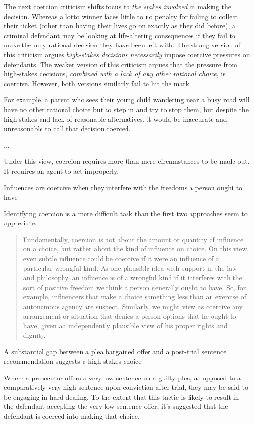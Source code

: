 The next coercion criticism shifts focus to \textit{the stakes involved} in making the decision. Whereas a lotto winner faces little to no penalty for failing to collect their ticket (other than having their lives go on exactly as they did before), a criminal defendant may be looking at life-altering consequences if they fail to make the only rational decision they have been left with. The strong version of this criticism argues \textit{high-stakes decisions necessarily} impose coercive pressures on defendants. The weaker version of this criticism argues that the pressure from high-stakes decisions, \textit{combined with a lack of any other rational choice}, is coercive. However, both versions similarly fail to hit the mark. 

For example, a parent who sees their young child wandering near a busy road will have no other rational choice but to step in and try to stop them, but despite the high stakes and lack of reasonable alternatives, it would be inaccurate and unreasonable to call that decision coerced. 

... 

Under this view, coercion requires more than mere circumstances to be made out. It requires an agent to act improperly. 

Influences are coercive when they interfere with the freedoms a person ought to have

Identifying coercion is a more difficult task than the first two approaches seem to appreciate.
\begin{quote}
    Fundamentally, coercion is not about the amount or quantity of influence on a choice, but rather about the kind of influence on \textbf{}choice. On this view, even subtle influence could be coercive if it were an influence of a particular wrongful kind. As one plausible idea with support in the law and philosophy, an influence is of a wrongful kind if it interferes with the sort of positive freedom we think a person generally ought to have. So, for example, influencers that make a choice something less than an exercise of autonomous agency are suspect. Similarly, we might view as coercive any arrangement or situation that denies a person options that he ought to have, given an independently plausible view of his proper rights and dignity.
\end{quote}

A substantial gap between a plea bargained offer and a post-trial sentence recommendation suggests a high-stakes choice

Where a prosecutor offers a very low sentence on a guilty plea, as opposed to a comparatively very high sentence upon conviction after trial, they may be said to be engaging in hard dealing. To the extent that this tactic is likely to result in the defendant accepting the very low sentence offer, it's suggested that the defendant is coerced into making that choice.

